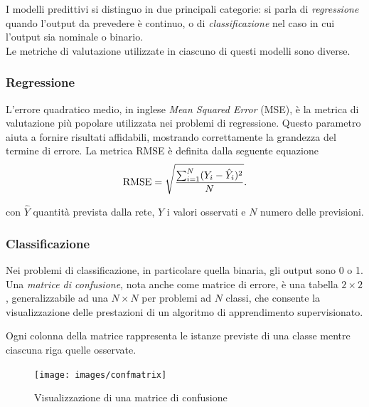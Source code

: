 I modelli predittivi si distinguo in due principali categorie: si parla di \emph{regressione} quando l'output da prevedere è continuo, o di \emph{classificazione} nel caso in cui l'output sia nominale o binario. \\
Le metriche di valutazione utilizzate in ciascuno di questi modelli sono diverse.

\subsubsection{Regressione}
\label{subsubsec:regressione}

L'{errore quadratico medio}, in inglese \emph{Mean Squared Error} (MSE), è la metrica di valutazione più popolare utilizzata nei problemi di regressione. Questo parametro aiuta a fornire risultati affidabili, mostrando correttamente la grandezza del termine di errore.
La metrica RMSE è definita dalla seguente equazione
\begin{equation}
	\operatorname{RMSE} = \sqrt{\frac{\sum_{i=1}^{N}({Y}_i - \hat{Y}_i)^2}{N}} \mbox{.}
	\label{eq:rmse}
\end{equation}

con $\hat{Y}$ quantità prevista dalla rete, $Y$ i valori osservati e $N$ numero delle previsioni.
\subsubsection{Classificazione}
\label{subsubsec:classificazione}

Nei problemi di classificazione, in particolare quella binaria, gli output sono 0 o 1. \\
Una \emph{matrice di confusione}, nota anche come matrice di errore, è una tabella $2 \times 2$, generalizzabile ad una $N \times N$ per problemi ad $N$ classi, che consente la visualizzazione delle prestazioni di un algoritmo di apprendimento supervisionato. 

Ogni colonna della matrice rappresenta le istanze previste di una classe mentre ciascuna riga quelle osservate. 

\begin{figure}[H]
	\centering
	{\texttt{[image: images/confmatrix]}}
	\caption{Visualizzazione di una matrice di confusione}
	\label{fig:confmat}
\end{figure}

